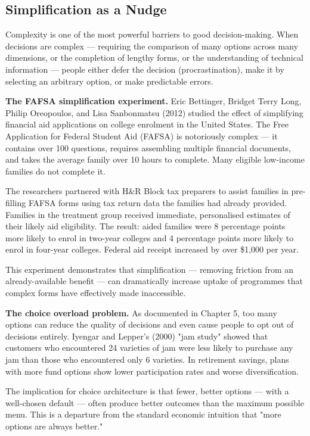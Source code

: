 \documentclass[12pt, letterpaper]{article}
\begin{document}
\subsection{Simplification as a Nudge}


Complexity is one of the most powerful barriers to good decision-making. When decisions are complex --- requiring the comparison of many options across many dimensions, or the completion of lengthy forms, or the understanding of technical information --- people either defer the decision (procrastination), make it by selecting an arbitrary option, or make predictable errors.

\textbf{The FAFSA simplification experiment.} Eric Bettinger, Bridget Terry Long, Philip Oreopoulos, and Lisa Sanbonmatsu (2012) studied the effect of simplifying financial aid applications on college enrolment in the United States. The Free Application for Federal Student Aid (FAFSA) is notoriously complex --- it contains over 100 questions, requires assembling multiple financial documents, and takes the average family over 10 hours to complete. Many eligible low-income families do not complete it.

The researchers partnered with H\&R Block tax preparers to assist families in pre-filling FAFSA forms using tax return data the families had already provided. Families in the treatment group received immediate, personalised estimates of their likely aid eligibility. The result: aided families were 8 percentage points more likely to enrol in two-year colleges and 4 percentage points more likely to enrol in four-year colleges. Federal aid receipt increased by over \$1,000 per year.

This experiment demonstrates that simplification --- removing friction from an already-available benefit --- can dramatically increase uptake of programmes that complex forms have effectively made inaccessible.

\textbf{The choice overload problem.} As documented in Chapter 5, too many options can reduce the quality of decisions and even cause people to opt out of decisions entirely. Iyengar and Lepper's (2000) "jam study" showed that customers who encountered 24 varieties of jam were less likely to purchase any jam than those who encountered only 6 varieties. In retirement savings, plans with more fund options show lower participation rates and worse diversification.

The implication for choice architecture is that fewer, better options --- with a well-chosen default --- often produce better outcomes than the maximum possible menu. This is a departure from the standard economic intuition that "more options are always better."
\end{document}
